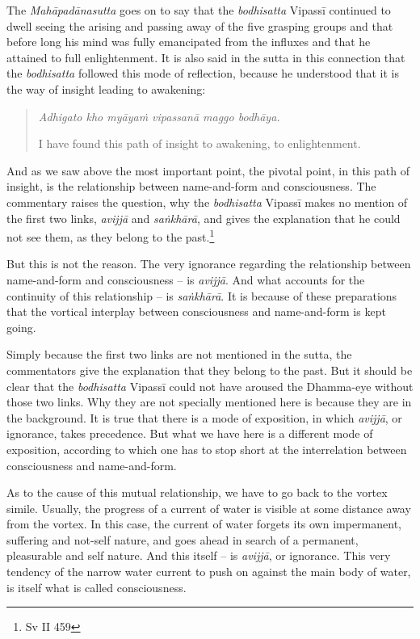 The \emph{Mahāpadānasutta} goes on to say that the \emph{bodhisatta} Vipassī continued to dwell seeing the arising and passing away of the five grasping groups and that before long his mind was fully emancipated from the influxes and that he attained to full enlightenment. It is also said in the sutta in this connection that the \emph{bodhisatta} followed this mode of reflection, because he understood that it is the way of insight leading to awakening:

\begin{quote}
\emph{Adhigato kho myāyaṁ vipassanā maggo bodhāya.}

I have found this path of insight to awakening, to enlightenment.
\end{quote}

And as we saw above the most important point, the pivotal point, in this path of insight, is the relationship between name-and-form and consciousness. The commentary raises the question, why the \emph{bodhisatta} Vipassī makes no mention of the first two links, \emph{avijjā} and \emph{saṅkhārā}, and gives the explanation that he could not see them, as they belong to the past.\footnote{Sv II 459}

But this is not the reason. The very ignorance regarding the relationship between name-and-form and consciousness -- is \emph{avijjā}. And what accounts for the continuity of this relationship -- is \emph{saṅkhārā}. It is because of these preparations that the vortical interplay between consciousness and name-and-form is kept going.

Simply because the first two links are not mentioned in the sutta, the commentators give the explanation that they belong to the past. But it should be clear that the \emph{bodhisatta} Vipassī could not have aroused the Dhamma-eye without those two links. Why they are not specially mentioned here is because they are in the background. It is true that there is a mode of exposition, in which \emph{avijjā}, or ignorance, takes precedence. But what we have here is a different mode of exposition, according to which one has to stop short at the interrelation between consciousness and name-and-form.

As to the cause of this mutual relationship, we have to go back to the vortex simile. Usually, the progress of a current of water is visible at some distance away from the vortex. In this case, the current of water forgets its own impermanent, suffering and not-self nature, and goes ahead in search of a permanent, pleasurable and self nature. And this itself -- is \emph{avijjā}, or ignorance. This very tendency of the narrow water current to push on against the main body of water, is itself what is called consciousness.

